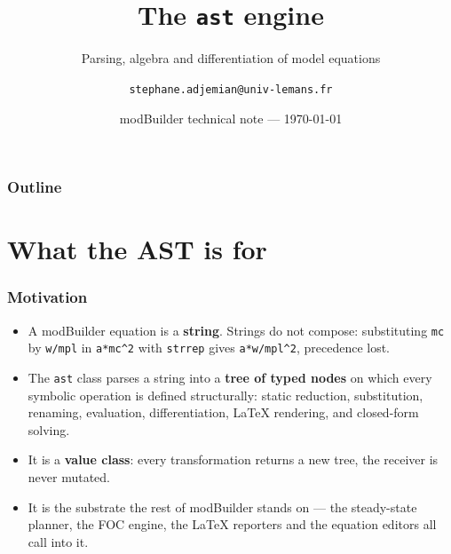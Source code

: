 \documentclass[10pt,slidestop]{beamer}
\title{The \texttt{ast} engine}
\subtitle{Parsing, algebra and differentiation of model equations}
\author{\texttt{stephane.adjemian@univ-lemans.fr}}
\date{modBuilder technical note --- \today}
\newcommand{\code}[1]{\texttt{#1}}
\begin{document}
\begin{frame}\titlepage\end{frame}

\begin{frame}\frametitle{Outline}\tableofcontents\end{frame}

\section{What the AST is for}

\begin{frame}\frametitle{Motivation}
  \begin{itemize}
  \item A modBuilder equation is a \textbf{string}. Strings do not compose:
    substituting \code{mc} by \code{w/mpl} in \code{a*mc\^{}2} with
    \code{strrep} gives \code{a*w/mpl\^{}2}, precedence lost.\newline
  \item The \code{ast} class parses a string into a \textbf{tree of typed
    nodes} on which every symbolic operation is defined structurally:
    static reduction, substitution, renaming, evaluation, differentiation,
    LaTeX rendering, and closed-form solving.\newline
  \item It is a \textbf{value class}: every transformation returns a new tree,
    the receiver is never mutated.\newline
  \item It is the substrate the rest of modBuilder stands on --- the steady-state
    planner, the FOC engine, the LaTeX reporters and the equation editors all
    call into it.
  \end{itemize}
\end{frame}
\end{document}
